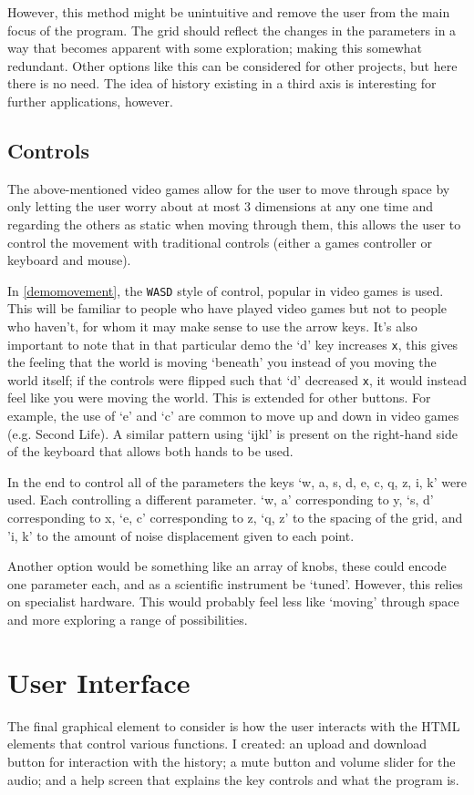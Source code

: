 However, this method might be unintuitive and remove the user from the main
focus of the program. The grid should reflect the changes in the parameters in a
way that becomes apparent with some exploration; making this somewhat redundant.
Other options like this can be considered for other projects, but here there is
no need. The idea of history existing in a third axis is interesting for further
applications, however. 

\subsection{Controls}
The above-mentioned video games allow for the user to move through space by
only letting the user worry about at most 3 dimensions at any one time and
regarding the others as static when moving through them, this allows the user to
control the movement with traditional controls (either a games controller or
keyboard and mouse).

In \autoref{demomovement}, the \verb|WASD| style of control, popular in video
games is used. This will be familiar to people who have played video games but
not to people who haven't, for whom it may make sense to use the arrow keys.
It's also important to note that in that particular demo the `d' key increases
\verb|x|, this gives the feeling that the world is moving `beneath' you instead
of you moving the world itself; if the controls were flipped such that `d'
decreased \verb|x|, it would instead feel like you were moving the world. This
is extended for other buttons. For example, the use of `e' and `c' are common to
move up and down in video games (e.g. Second Life). A similar pattern using
`ijkl' is present on the right-hand side of the keyboard that allows both hands
to be used.

In the end to control all of the parameters the keys `w, a, s, d, e, c, q, z, i,
k' were used. Each controlling a different parameter. `w, a' corresponding to y,
`s, d' corresponding to x, `e, c' corresponding to z, `q, z' to the spacing of
the grid, and 'i, k' to the amount of noise displacement given to each point.

Another option would be something like an array of knobs, these could encode one
parameter each, and as a scientific instrument be `tuned'. However, this relies
on specialist hardware. This would probably feel less like `moving' through
space and more exploring a range of possibilities.

\section{User Interface}
The final graphical element to consider is how the user interacts with the HTML
elements that control various functions. I created: an upload and download button
for interaction with the history; a mute button and volume slider for the audio;
and a help screen that explains the key controls and what the program is.

